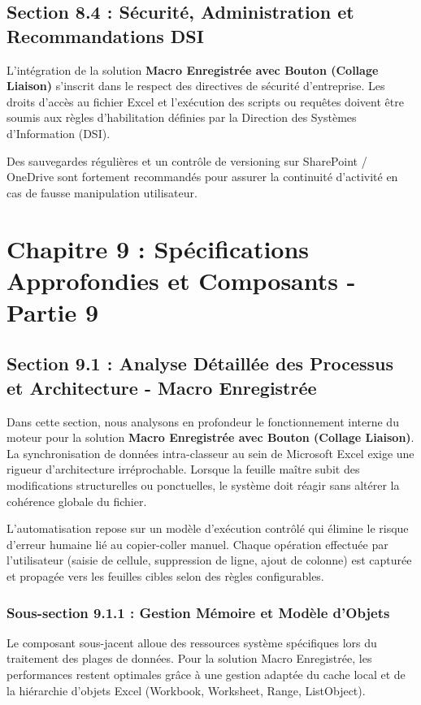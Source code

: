\documentclass[12pt,a4paper]{report}
\begin{document}
\section{Section 8.4 : Sécurité, Administration et Recommandations DSI}
L'intégration de la solution \textbf{Macro Enregistrée avec Bouton (Collage Liaison)} s'inscrit dans le respect des directives de sécurité d'entreprise. Les droits d'accès au fichier Excel et l'exécution des scripts ou requêtes doivent être soumis aux règles d'habilitation définies par la Direction des Systèmes d'Information (DSI).

Des sauvegardes régulières et un contrôle de versioning sur SharePoint / OneDrive sont fortement recommandés pour assurer la continuité d'activité en cas de fausse manipulation utilisateur.


\chapter{Chapitre 9 : Spécifications Approfondies et Composants - Partie 9}

\section{Section 9.1 : Analyse Détaillée des Processus et Architecture - Macro Enregistrée}
Dans cette section, nous analysons en profondeur le fonctionnement interne du moteur pour la solution \textbf{Macro Enregistrée avec Bouton (Collage Liaison)}. La synchronisation de données intra-classeur au sein de Microsoft Excel exige une rigueur d'architecture irréprochable. Lorsque la feuille maître subit des modifications structurelles ou ponctuelles, le système doit réagir sans altérer la cohérence globale du fichier.

L'automatisation repose sur un modèle d'exécution contrôlé qui élimine le risque d'erreur humaine lié au copier-coller manuel. Chaque opération effectuée par l'utilisateur (saisie de cellule, suppression de ligne, ajout de colonne) est capturée et propagée vers les feuilles cibles selon des règles configurables.


\subsection{Sous-section 9.1.1 : Gestion Mémoire et Modèle d'Objets}
Le composant sous-jacent alloue des ressources système spécifiques lors du traitement des plages de données. Pour la solution Macro Enregistrée, les performances restent optimales grâce à une gestion adaptée du cache local et de la hiérarchie d'objets Excel (Workbook, Worksheet, Range, ListObject).
\end{document}
